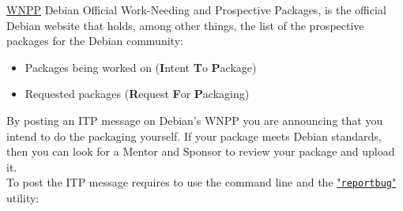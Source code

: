 \href{http://www.debian.org/devel/wnpp/}{WNPP} Debian Official Work-Needing and Prospective Packages, is the official Debian website that holds, 
among other things, the list of the prospective packages for the Debian community: 
\begin{itemize}
\item Packages being worked on ({\bf{I}}ntent {\bf{T}}o {\bf{P}}ackage)
\item Requested packages ({\bf{R}}equest {\bf{F}}or {\bf{P}}ackaging)
\end{itemize}
By posting an ITP message on Debian's WNPP you are announcing that you intend to do the packaging yourself. 
If your package meets Debian standards, then you can look for a Mentor and Sponsor to review your package and upload it. \\[0.25cm]
To post the ITP message requires to use the command line and the \href{https://wiki.debian.org/reportbug}{"\texttt{reportbug}"} utility:
